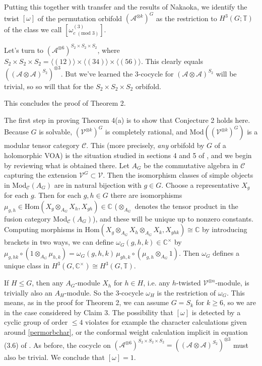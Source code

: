 \documentclass[12pt]{article}
\numberwithin{equation}{section}
\def\cA            {{\mathcal{A}}}
\def\cC            {{\mathcal{C}}}
\def\cV            {{\mathcal{V}}}
\def\bbC           {\mathbb{C}}
\def\bbT           {\mathbb{T}}
\begin{document}
Putting this together with transfer and the results of Nakaoka, we identify the twist
$[\omega]$ of the permutation orbifold $(\cA^{\otimes k})^G$ as the restriction to  $H^3(G;\bbT)$
of the class we call $[\omega^{(3)}_{c\,\, (\mathrm{mod}\,\, 3)}]$. 

Let's turn to $(\cA^{\otimes 6})^{S_2\times S_2\times S_2}$, where $S_2\times S_2\times S_2=\langle(12)\rangle\times\langle(34)\rangle\times\langle(56)\rangle$. This clearly
equals  $((\cA\otimes\cA)^{S_2})^{\otimes 3}$. But we've learned the 3-cocycle for $(\cA\otimes\cA)^{S_2}$ will be trivial, so so will that for the $S_2\times S_2\times S_2$ orbifold.

This concludes the proof of Theorem 2.\medskip
 
 The first step in proving Theorem 4(a) is to show that Conjecture 2 holds here. Because $G$ is solvable, $(\cV^{\otimes k})^G$ is completely rational, and Mod$((\cV^{\otimes k})^G)$ is a modular tensor category $\cC$. This (more precisely, \textit{any} orbifold by $G$ of a holomorphic VOA) is the situation studied in sections 4 and 5 of \cite{Kir}, and we begin by reviewing what is obtained there. Let $A_G$ be the commutative algebra in $\cC$ capturing the extension $\cV^G\subset\cV$. Then  the isomorphism classes of simple objects in Mod$_\cC(A_G)$ are in natural bijection with $g\in G$. Choose a representative  $X_g$ for each $g$. Then for each $g,h\in G$ there are isomorphisms $\mu_{g,h}\in\mathrm{Hom}(X_g\otimes_{A_G}X_h,X_{gh})\in\bbC$ ($\otimes_{A_G}$ denotes the tensor product in the fusion category Mod$_\cC(A_G)$), and these will be unique up to nonzero constants. Computing morphisms
in Hom$(X_g\otimes_{A_G} X_h\otimes_{A_G} X_k,X_{ghk})\cong \bbC$ by introducing brackets in two ways, we can define $\omega_G(g,h,k)\in\bbC^\times$ by $\mu_{g,hk}\circ(1\otimes_{A_G}\mu_{h,k})=\omega_G(g,h,k)\,
\mu_{gh,k}\circ (\mu_{g,h}\otimes_{A_G} 1)$. Then $\omega_G$ defines a unique class in $H^3(G,\bbC^\times)\cong H^3(G,\bbT)$.

If $H\leq G$, then any $A_G$-module $X_h$ for $h\in H$, i.e. any $h$-twisted $\cV^{\otimes n}$-module, is trivially also an $A_H$-module. So the 3-cocycle $\omega_H$ is the restriction
of $\omega_G$. This means, as in the proof for Theorem 2, we can assume $G=S_k$ for $k\ge 6$, so we are in the case considered by Claim 3. The possibility that $[\omega]$ is detected by a cyclic
group of order $\le 4$  violates for example the character calculations given around \eqref{permorbchar}, or the conformal weight calculation  implicit in equation (3.6) of  \cite{BDM}. As before, the cocycle
on $(\cA^{\otimes 6})^{S_2\times S_2\times S_2}=((\cA\otimes\cA)^{S_2})^{\otimes 3}$ must also be trivial. We conclude that $[\omega]=1$.
\end{document}
